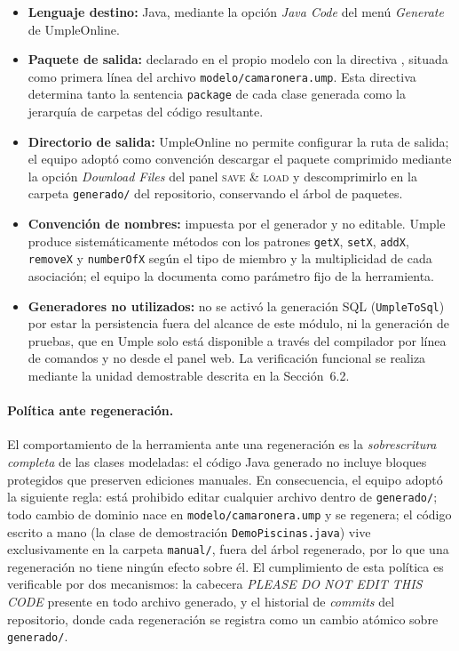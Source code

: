 \documentclass[11pt,a4paper]{article}
\begin{document}
\begin{itemize}
  \item \textbf{Lenguaje destino:} Java, mediante la opción
        \emph{Java Code} del menú \emph{Generate} de UmpleOnline.
  \item \textbf{Paquete de salida:} declarado en el propio modelo con
        la directiva ,
        situada como primera línea del archivo
        \texttt{modelo/camaronera.ump}. Esta directiva determina tanto
        la sentencia \texttt{package} de cada clase generada como la
        jerarquía de carpetas del código resultante.
  \item \textbf{Directorio de salida:} UmpleOnline no permite
        configurar la ruta de salida; el equipo adoptó como convención
        descargar el paquete comprimido mediante la opción
        \emph{Download Files} del panel \textsc{save \& load} y
        descomprimirlo en la carpeta \texttt{generado/} del
        repositorio, conservando el árbol de paquetes.
  \item \textbf{Convención de nombres:} impuesta por el generador y no
        editable. Umple produce sistemáticamente métodos con los
        patrones \texttt{getX}, \texttt{setX}, \texttt{addX},
        \texttt{removeX} y \texttt{numberOfX} según el tipo de miembro
        y la multiplicidad de cada asociación; el equipo la documenta
        como parámetro fijo de la herramienta.
  \item \textbf{Generadores no utilizados:} no se activó la generación
        SQL (\texttt{UmpleToSql}) por estar la persistencia fuera del
        alcance de este módulo, ni la generación de pruebas, que en
        Umple solo está disponible a través del compilador por línea
        de comandos y no desde el panel web. La verificación funcional
        se realiza mediante la unidad demostrable descrita en la
        Sección~6.2.
\end{itemize}

\paragraph{Política ante regeneración.}
El comportamiento de la herramienta ante una regeneración es la
\emph{sobrescritura completa} de las clases modeladas: el código Java
generado no incluye bloques protegidos que preserven ediciones
manuales. En consecuencia, el equipo adoptó la siguiente regla: está
prohibido editar cualquier archivo dentro de \texttt{generado/}; todo
cambio de dominio nace en \texttt{modelo/camaronera.ump} y se
regenera; el código escrito a mano (la clase de demostración
\texttt{DemoPiscinas.java}) vive exclusivamente en la carpeta
\texttt{manual/}, fuera del árbol regenerado, por lo que una
regeneración no tiene ningún efecto sobre él. El cumplimiento de esta
política es verificable por dos mecanismos: la cabecera
\emph{PLEASE DO NOT EDIT THIS CODE} presente en todo archivo generado,
y el historial de \emph{commits} del repositorio, donde cada
regeneración se registra como un cambio atómico sobre
\texttt{generado/}.
\end{document}
